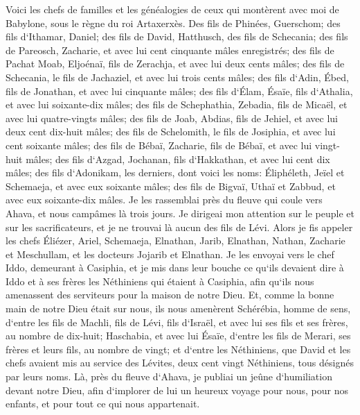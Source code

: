 \verse Voici les chefs de familles et les généalogies de ceux qui montèrent avec moi de Babylone, sous le règne du roi Artaxerxès. 
\verse Des fils de Phinées, Guerschom; des fils d`Ithamar, Daniel; des fils de David, Hatthusch, des fils de Schecania; 
\verse des fils de Pareosch, Zacharie, et avec lui cent cinquante mâles enregistrés; 
\verse des fils de Pachat Moab, Eljoénaï, fils de Zerachja, et avec lui deux cents mâles; 
\verse des fils de Schecania, le fils de Jachaziel, et avec lui trois cents mâles; 
\verse des fils d`Adin, Ébed, fils de Jonathan, et avec lui cinquante mâles; 
\verse des fils d`Élam, Ésaïe, fils d`Athalia, et avec lui soixante-dix mâles; 
\verse des fils de Schephathia, Zebadia, fils de Micaël, et avec lui quatre-vingts mâles; 
\verse des fils de Joab, Abdias, fils de Jehiel, et avec lui deux cent dix-huit mâles; 
\verse des fils de Schelomith, le fils de Josiphia, et avec lui cent soixante mâles; 
\verse des fils de Bébaï, Zacharie, fils de Bébaï, et avec lui vingt-huit mâles; 
\verse des fils d`Azgad, Jochanan, fils d`Hakkathan, et avec lui cent dix mâles; 
\verse des fils d`Adonikam, les derniers, dont voici les noms: Éliphéleth, Jeïel et Schemaeja, et avec eux soixante mâles; 
\verse des fils de Bigvaï, Uthaï et Zabbud, et avec eux soixante-dix mâles. 
\verse Je les rassemblai près du fleuve qui coule vers Ahava, et nous campâmes là trois jours. Je dirigeai mon attention sur le peuple et sur les sacrificateurs, et je ne trouvai là aucun des fils de Lévi. 
\verse Alors je fis appeler les chefs Éliézer, Ariel, Schemaeja, Elnathan, Jarib, Elnathan, Nathan, Zacharie et Meschullam, et les docteurs Jojarib et Elnathan. 
\verse Je les envoyai vers le chef Iddo, demeurant à Casiphia, et je mis dans leur bouche ce qu`ils devaient dire à Iddo et à ses frères les Néthiniens qui étaient à Casiphia, afin qu`ils nous amenassent des serviteurs pour la maison de notre Dieu. 
\verse Et, comme la bonne main de notre Dieu était sur nous, ils nous amenèrent Schérébia, homme de sens, d`entre les fils de Machli, fils de Lévi, fils d`Israël, et avec lui ses fils et ses frères, au nombre de dix-huit; 
\verse Haschabia, et avec lui Ésaïe, d`entre les fils de Merari, ses frères et leurs fils, au nombre de vingt; 
\verse et d`entre les Néthiniens, que David et les chefs avaient mis au service des Lévites, deux cent vingt Néthiniens, tous désignés par leurs noms. 
\verse Là, près du fleuve d`Ahava, je publiai un jeûne d`humiliation devant notre Dieu, afin d`implorer de lui un heureux voyage pour nous, pour nos enfants, et pour tout ce qui nous appartenait. 
